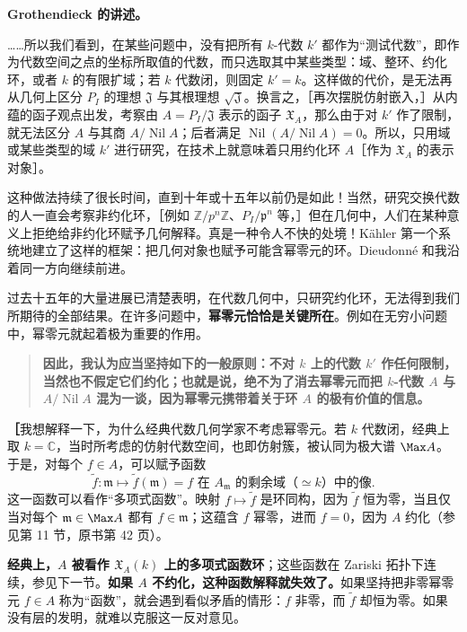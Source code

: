 \textbf{Grothendieck 的讲述。}

……所以我们看到，在某些问题中，没有把所有 $k$-代数 $k'$ 都作为“测试代数”，即作为代数空间之点的坐标所取值的代数，而只选取其中某些类型：域、整环、约化环，或者 $k$ 的有限扩域；若 $k$ 代数闭，则固定 $k'=k$。这样做的代价，是无法再从几何上区分 $P_I$ 的理想 $\mathfrak J$ 与其根理想 $\sqrt{\mathfrak J}$。换言之，［再次摆脱仿射嵌入，］从内蕴的函子观点出发，考察由 $A=P_I/\mathfrak J$ 表示的函子 $\mathfrak X_A$，那么由于对 $k'$ 作了限制，就无法区分 $A$ 与其商 $A/\operatorname{Nil}A$；后者满足 $\operatorname{Nil}(A/\operatorname{Nil}A)=0$。所以，只用域或某些类型的域 $k'$ 进行研究，在技术上就意味着只用约化环 $A$［作为 $\mathfrak X_A$ 的表示对象］。

这种做法持续了很长时间，直到十年或十五年以前仍是如此！当然，研究交换代数的人一直会考察非约化环，［例如 $\mathbb Z/p^n\mathbb Z$、$P_I/\mathfrak p^n$ 等，］但在几何中，人们在某种意义上拒绝给非约化环赋予几何解释。真是一种令人不快的处境！Kähler 第一个系统地建立了这样的框架：把几何对象也赋予可能含幂零元的环。Dieudonné 和我沿着同一方向继续前进。

过去十五年的大量进展已清楚表明，在代数几何中，只研究约化环，无法得到我们所期待的全部结果。在许多问题中，\textbf{幂零元恰恰是关键所在}。例如在无穷小问题中，幂零元就起着极为重要的作用。

\begin{quote}\bfseries 因此，我认为应当坚持如下的一般原则：不对 $k$ 上的代数 $k'$ 作任何限制，当然也不假定它们约化；也就是说，绝不为了消去幂零元而把 $k$-代数 $A$ 与 $A/\operatorname{Nil}A$ 混为一谈，因为幂零元携带着关于环 $A$ 的极有价值的信息。\end{quote}
\textbf{［}我想解释一下，为什么经典代数几何学家不考虑幂零元。若 $k$ 代数闭，经典上取 $k=\mathbb C$，当时所考虑的仿射代数空间，也即仿射簇，被认同为极大谱 $\Max A$。于是，对每个 $f\in A$，可以赋予函数
\[
\widetilde f\colon\mathfrak m\longmapsto\widetilde f(\mathfrak m)
=\text{$f$ 在 $A_{\mathfrak m}$ 的剩余域（$\simeq k$）中的像}.
\]
这一函数可以看作“多项式函数”。映射 $f\mapsto\widetilde f$ 是环同构，因为 $\widetilde f$ 恒为零，当且仅当对每个 $\mathfrak m\in\Max A$ 都有 $f\in\mathfrak m$；这蕴含 $f$ 幂零，进而 $f=0$，因为 $A$ 约化（参见第 11 节，原书第 42 页）。

\textbf{经典上，$A$ 被看作 $\mathfrak X_A(k)$ 上的多项式函数环}；这些函数在 Zariski 拓扑下连续，参见下一节。\textbf{如果 $A$ 不约化，这种函数解释就失效了。}如果坚持把非零幂零元 $f\in A$ 称为“函数”，就会遇到看似矛盾的情形：$f$ 非零，而 $\widetilde f$ 却恒为零。如果没有层的发明，就难以克服这一反对意见。

